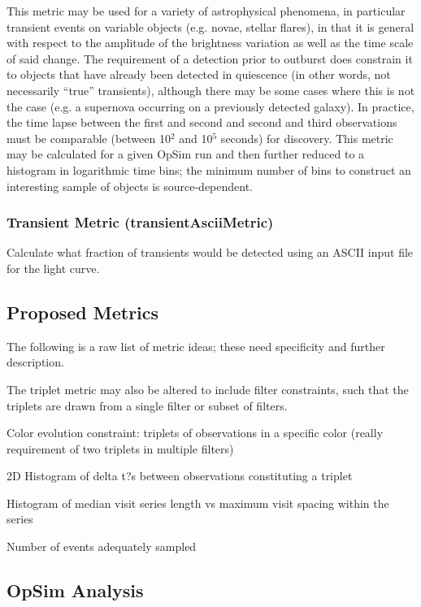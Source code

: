 This metric may be used for a variety of astrophysical phenomena, in
particular transient events on variable objects (e.g. novae, stellar
flares), in that it is general with respect to the amplitude of the
brightness variation as well as the time scale of said change. The
requirement of a detection prior to outburst does constrain it to
objects that have already been detected in quiescence (in other words,
not necessarily ``true'' transients), although there may be some cases
where this is not the case (e.g. a supernova occurring on a previously
detected galaxy). In practice, the time lapse between the first and
second and second and third observations must be comparable (between
10$^2$ and 10$^5$ seconds) for discovery. This metric may be
calculated for a given OpSim run and then further reduced to a
histogram in logarithmic time bins; the minimum number of bins to
construct an interesting sample of objects is source-dependent.

\subsubsection{Transient Metric (transientAsciiMetric)}

Calculate what fraction of transients would be detected using an ASCII
input file for the light curve.

\subsection{Proposed Metrics}

The following is a raw list of metric ideas; these need specificity
and further description.

The triplet metric may also be altered to include filter constraints,
such that the triplets are drawn from a single filter or subset of
filters.

Color evolution constraint: triplets of observations in a specific
color (really requirement of two triplets in multiple filters)

  2D Histogram of delta t?s between observations constituting a triplet

Histogram of median visit series length vs maximum visit spacing
within the series

Number of events adequately sampled


\subsection{OpSim Analysis}
\label{sec:\chpname:analysis}

